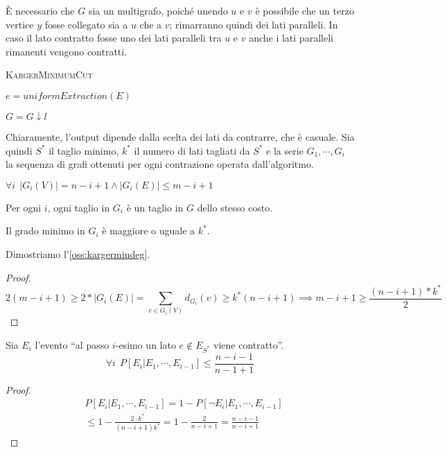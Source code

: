 \`E necessario che $G$ sia
un multigrafo, poiché unendo $u$ e $v$ è possibile che un terzo vertice $y$
fosse collegato sia a $u$ che a $v$; rimarranno quindi dei lati paralleli.
In caso il lato contratto fosse uno dei lati paralleli tra $u$ e $v$ anche
i lati paralleli rimanenti vengono contratti.

\begin{algorithm}[h]
	\caption{\textsc{KargerMinimumCut}}
	\label{algo:Karger}

	{
	}
	{
		$e = uniformExtraction(E)$

		$G = G\downarrow l$

	}


\end{algorithm}

Chiaramente, l'output dipende dalla scelta dei lati da contrarre, che è casuale.
Sia quindi $S^*$ il taglio minimo, $k^*$ il numero di lati tagliati da $S^*$ e
la serie $G_1, \cdots, G_i$ la sequenza di grafi ottenuti per ogni contrazione
operata dall'algoritmo.
\begin{oss}\label{oss:kargercontraction}
	$\forall i ~~ |G_i(V)| = n - i + 1 \land |G_i(E)| \leq m - i + 1$
\end{oss}
\begin{oss}\label{oss:kargercuts}
	Per ogni $i$, ogni taglio in $G_i$ è un taglio in $G$ dello stesso costo.
\end{oss}
\begin{oss}\label{oss:kargermindeg}
	Il grado minimo in $G_i$ è maggiore o uguale a $k^*$.
\end{oss}

Dimostriamo l'\cref{oss:kargermindeg}.
\begin{proof}
	$$
		2(m - i +1) \geq 2 * |G_i(E)| = \sum_{v \in G_i(V)} d_{G_i}(v) \geq k^* (n - i + 1) \implies m - i  +1 \geq \frac{(n - i + 1) * k^*}{2}
	$$
\end{proof}

\begin{lemma}

	Sia $E_i$ l'evento ``al passo $i$-esimo un lato $e \notin E_{S^*}$ viene contratto''.
	$$
		\forall i ~~ P[E_i | E_1, \cdots, E_{i-1}] \leq \frac{n-i-1}{n-1+1}
	$$
\end{lemma}
\begin{proof}
	\begin{align*}
		 & P[E_i | E_1, \cdots, E_{i -1}]  = 1 - P[\neg E_i | E_1, \cdots, E_{i -1}]                        \\
		 & \leq 1 - \frac{2\cdot k^*}{(n - i +1 ) k^*} = 1 - \frac{2}{n - i +1} = \frac{n - i -1}{n -i + 1}
	\end{align*}
\end{proof}

